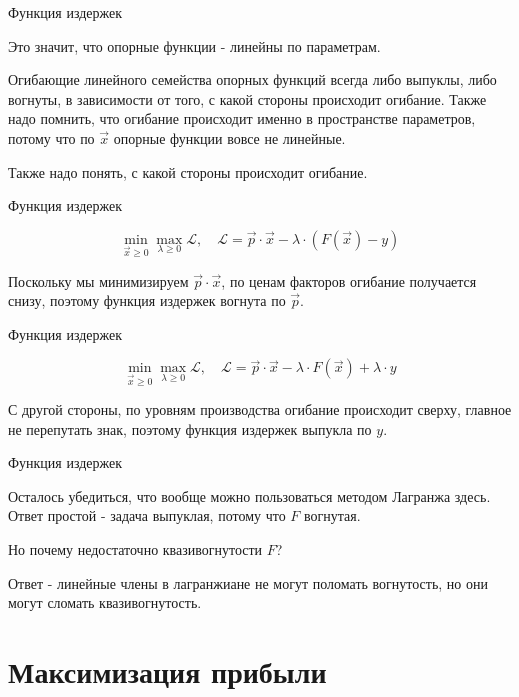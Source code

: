 \documentclass{beamer}
\begin{document}
\begin{frame}{Функция издержек}

Это значит, что опорные функции - линейны по параметрам.

Огибающие линейного семейства опорных функций всегда либо выпуклы, либо вогнуты, в зависимости от того, с какой стороны происходит огибание. Также надо помнить, что огибание происходит именно в пространстве параметров, потому что по $\vec x$ опорные функции вовсе не линейные. 

Также надо понять, с какой стороны происходит огибание.

\end{frame}

\begin{frame}{Функция издержек}

$$ \min_{\vec x \geqslant 0} \max_{\lambda \geqslant 0} \mathcal{L}, \quad \mathcal{L} = \vec p \cdot \vec x - \lambda \cdot (F(\vec x) - y)$$

Поскольку мы минимизируем $\vec p \cdot \vec x$, по ценам факторов огибание получается снизу, поэтому функция издержек вогнута по $\vec p$.

\end{frame}

\begin{frame}{Функция издержек}

$$ \min_{\vec x \geqslant 0} \max_{\lambda \geqslant 0} \mathcal{L}, \quad \mathcal{L} = \vec p \cdot \vec x - \lambda \cdot F(\vec x) + \lambda \cdot y$$

С другой стороны, по уровням производства огибание происходит сверху, главное не перепутать знак, поэтому функция издержек выпукла по $y$.

\end{frame}

\begin{frame}{Функция издержек}

Осталось убедиться, что вообще можно пользоваться методом Лагранжа здесь. Ответ простой - задача выпуклая, потому что $F$ вогнутая. 

Но почему недостаточно квазивогнутости $F$? 

Ответ - линейные члены в лагранжиане не могут поломать вогнутость, но они могут сломать квазивогнутость.

\end{frame}

\section{Максимизация прибыли}
\end{document}
